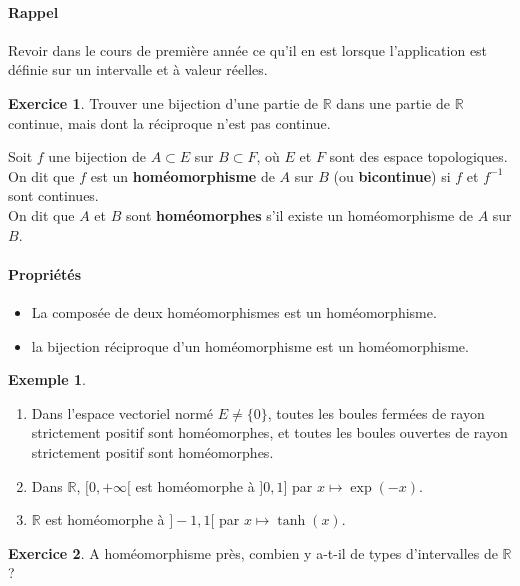 \documentclass[french]{article}
\newcommand{\R}{\mathbb{R}}
\newcommand{\inv}{^{-1}}
\theoremstyle{plain}
\theoremstyle{definition}
\newtheorem*{ex}{Exemple}
\newtheorem{exo}{Exercice}
\theoremstyle{remark}
\begin{document}
\paragraph{Rappel} Revoir dans le cours de première année ce qu'il en est lorsque l'application est définie sur un intervalle et à valeur réelles.

\begin{exo}
	Trouver une bijection d'une partie de $\R$ dans une partie de $\R$ continue, mais dont la réciproque n'est pas continue.
\end{exo}

\begin{dfn}
	Soit $f$ une bijection de $A\subset E$ sur $B\subset F$, où $E$ et $F$ sont des espace topologiques. On dit que $f$ est un \textbf{homéomorphisme} de $A$ sur $B$ (ou \textbf{bicontinue}) si $f$ et $f\inv$ sont continues. \\
	On dit que $A$ et $B$ sont \textbf{homéomorphes} s'il existe un homéomorphisme de $A$ sur $B$.
\end{dfn}

\paragraph{Propriétés}
\begin{itemize}
	\item La composée de deux homéomorphismes est un homéomorphisme.
	\item la bijection réciproque d'un homéomorphisme est un homéomorphisme.
\end{itemize}

\begin{ex}
	\begin{enumerate}
		\item Dans l'espace vectoriel normé $E\ne\{0\}$, toutes les boules fermées de rayon strictement positif sont homéomorphes, et toutes les boules ouvertes de rayon strictement positif sont homéomorphes.
		\item Dans $\R$, $[0,+\infty[$ est homéomorphe à $]0,1]$ par $x\mapsto \exp(-x)$.
		\item $\R$ est homéomorphe à $]-1,1[$ par $x\mapsto\tanh(x)$.
	\end{enumerate}
\end{ex}

\begin{exo}
	A homéomorphisme près, combien y a-t-il de types d'intervalles de $\R$ ?
\end{exo}
\end{document}
